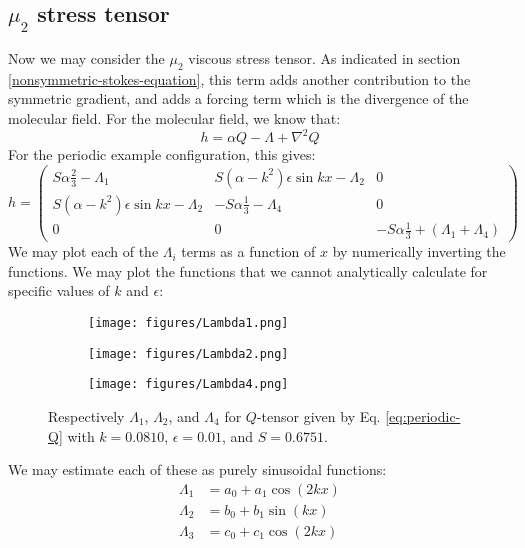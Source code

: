 \documentclass[reqno]{article}
\begin{document}
\subsection{$\mu_2$ stress tensor}
Now we may consider the $\mu_2$ viscous stress tensor.
As indicated in section \ref{nonsymmetric-stokes-equation}, this term adds
another contribution to the symmetric gradient, and adds a forcing term which is
the divergence of the molecular field.
For the molecular field, we know that:
\begin{equation}
  h
  =
  \alpha Q
  - \Lambda
  + \nabla^2 Q
\end{equation}
For the periodic example configuration, this gives:
\begin{equation}
  h
  =
  \begin{pmatrix}
    S\alpha \tfrac23 - \Lambda_1 & S\left( \alpha - k^2\right) \epsilon \sin kx - \Lambda_2 & 0 \\
    S \left( \alpha - k^2\right) \epsilon \sin kx - \Lambda_2 & -S \alpha \tfrac13 - \Lambda_4 & 0 \\
    0 & 0 & -S\alpha \tfrac13 + (\Lambda_1 + \Lambda_4)
  \end{pmatrix}
\end{equation}
We may plot each of the $\Lambda_i$ terms as a function of $x$ by numerically
inverting the functions.
We may plot the functions that we cannot analytically calculate for specific
values of $k$ and $\epsilon$:
\begin{figure}[H] 
  \centering
  \begin{subfigure}{0.45\textwidth}
    \texttt{[image: figures/Lambda1.png]}
    \caption{}
    \label{fig:Lambda1}
  \end{subfigure}
  \hfill
  \begin{subfigure}{0.45\textwidth}
    \texttt{[image: figures/Lambda2.png]}
    \caption{}
    \label{fig:Lambda2}
  \end{subfigure}
  \hfill
  \begin{subfigure}{0.45\textwidth}
    \texttt{[image: figures/Lambda4.png]}
    \caption{}
    \label{fig:Lambda4}
  \end{subfigure}
  \caption{Respectively $\Lambda_1$, $\Lambda_2$, and
    $\Lambda_4$ for $Q$-tensor given by Eq. \eqref{eq:periodic-Q}
    with $k = 0.0810$, $\epsilon = 0.01$, and $S = 0.6751$.}
  \label{fig:Lambda_i}
\end{figure}
We may estimate each of these as purely sinusoidal functions:
\begin{align}
  \Lambda_1 &= a_0 + a_1 \cos(2kx) \\
  \Lambda_2 &= b_0 + b_1 \sin(kx) \\
  \Lambda_3 &= c_0 + c_1 \cos(2kx)
\end{align}
\end{document}
